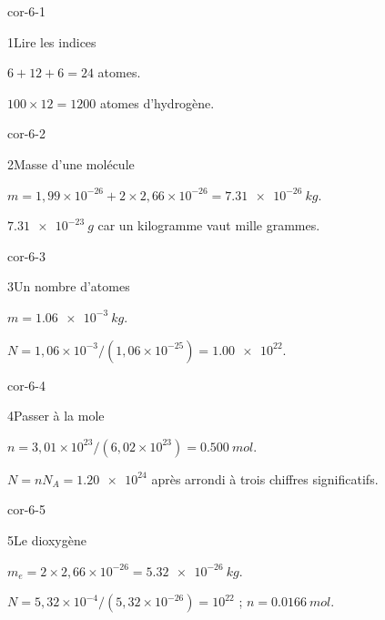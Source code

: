 \clearpage{}
\corrigesSouples
\begin{blocLivre}{cor-6-1}\begin{corrige}{1}{Lire les indices}
\begin{questions}
\item $6+12+6=24$ atomes.
\item $100\times12=1200$ atomes d’hydrogène.
\end{questions}
\end{corrige}\end{blocLivre}
\begin{blocLivre}{cor-6-2}\begin{corrige}{2}{Masse d’une molécule}
\begin{questions}
\item $m=1,99\times10^{-26}+2\times2,66\times10^{-26}=\qty{7,31e-26}{kg}$.
\item $\qty{7,31e-23}{g}$ car un kilogramme vaut mille grammes.
\end{questions}
\end{corrige}\end{blocLivre}
\begin{blocLivre}{cor-6-3}\begin{corrige}{3}{Un nombre d’atomes}
\begin{questions}
\item $m=\qty{1,06e-3}{kg}$.
\item $N=1,06\times10^{-3}/(1,06\times10^{-25})=\num{1,00e22}$.
\end{questions}
\end{corrige}\end{blocLivre}
\begin{blocLivre}{cor-6-4}\begin{corrige}{4}{Passer à la mole}
\begin{questions}
\item $n=3,01\times10^{23}/(6,02\times10^{23})=\qty{0,500}{mol}$.
\item $N=nN_A=\num{1,20e24}$ après arrondi à trois chiffres significatifs.
\end{questions}
\end{corrige}\end{blocLivre}
\begin{blocLivre}{cor-6-5}\begin{corrige}{5}{Le dioxygène}
\begin{questions}
\item $m_e=2\times2,66\times10^{-26}=\qty{5,32e-26}{kg}$.
\item $N=5,32\times10^{-4}/(5,32\times10^{-26})=10^{22}$ ; $n=\qty{0,0166}{mol}$.
\end{questions}
\end{corrige}\end{blocLivre}
